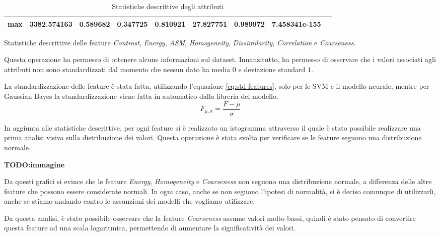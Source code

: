 \begin{table}[h!]
\begin{subtable}[h]{1\textwidth}
{\begin{tabular}{c|c c c c c c c c}
                        \textbf{max}                                              & 3382.574163       & 0.589682        & 0.347725     & 0.810921             & 27.827751              & 0.989972             & 7.458341e-155       \\ \hline
                  \end{tabular}}
            \caption{Statistiche descrittive delle feature \textit{Contrast}, \textit{Energy}, \textit{ASM}, \textit{Homogeneity}, \textit{Dissimilarity}, \textit{Correlation} e \textit{Coarseness}.}
            \label{tab:secondameta}
      \end{subtable}
      \caption{Statistiche descrittive degli attributi}
      \label{tab:desc-stat}
\end{table}

Questa operazione ha permesso di ottenere alcune informazioni sul dataset.
Innanzitutto, ha permesso di osservare che i valori associati agli attributi non
sono standardizzati dal momento che nessun dato ha media $0$ e deviazione
standard $1$.

La standardizzazione delle feature è stata fatta, utilizzando l'equazione
\ref{eq:std-features}, solo per le SVM e il modello neurale, mentre per Gaussian
Bayes la standardizzazione viene fatta in automatico dalla libreria del modello.
\begin{equation}
      F_{\mu, \sigma} = \frac{F - \mu}{\sigma}
      \label{eq:std-features}
\end{equation}

In aggiunta alle statistiche descrittive, per ogni feature si è realizzato un
istogramma attraverso il quale è stato possibile realizzare una prima analisi
visiva sulla distribuzione dei valori. Questa operazione è stata svolta per
verificare se le feature seguono una distribuzione normale.

\textbf{TODO:immagine}

Da questi grafici si evince che le feature \textit{Energy}, \textit{Homogeneity}
e \textit{Coarseness} non seguono una distribuzione normale, a differenza delle
altre feature che possono essere considerate normali. In ogni caso, anche se non
seguono l'ipotesi di normalità, si è deciso comunque di utilizzarli, anche se
stiamo andando contro le assunzioni dei modelli che vogliamo utilizzare. %

Da questa analisi, è stato possibile osservare che la feature \textit{Coarseness}
assume valori molto bassi, quindi è stato pensato di convertire questa feature
ad una scala logaritmica, permettendo di aumentare la significatività dei valori.

